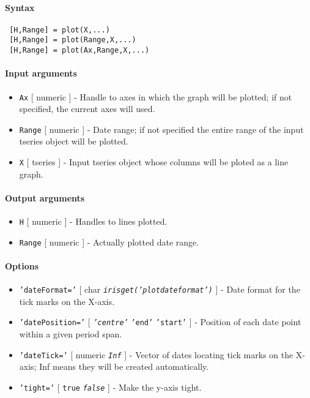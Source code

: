 


	\paragraph{Syntax}
 
 \begin{verbatim}
 [H,Range] = plot(X,...)
 [H,Range] = plot(Range,X,...)
 [H,Range] = plot(Ax,Range,X,...)
 \end{verbatim}
 
 \paragraph{Input arguments}
 
 \begin{itemize}
 \item
   \texttt{Ax} {[} numeric {]} - Handle to axes in which the graph will
   be plotted; if not specified, the current axes will used.
 \item
   \texttt{Range} {[} numeric {]} - Date range; if not specified the
   entire range of the input tseries object will be plotted.
 \item
   \texttt{X} {[} tseries {]} - Input tseries object whose columns will
   be ploted as a line graph.
 \end{itemize}
 
 \paragraph{Output arguments}
 
 \begin{itemize}
 \item
   \texttt{H} {[} numeric {]} - Handles to lines plotted.
 \item
   \texttt{Range} {[} numeric {]} - Actually plotted date range.
 \end{itemize}
 
 \paragraph{Options}
 
 \begin{itemize}
 \item
   \texttt{'dateFormat='} {[} char \textbar{}
   \emph{\texttt{irisget('plotdateformat')}} {]} - Date format for the
   tick marks on the X-axis.
 \item
   \texttt{'datePosition='} {[} \emph{\texttt{'centre'}} \textbar{}
   \texttt{'end'} \textbar{} \texttt{'start'} {]} - Position of each date
   point within a given period span.
 \item
   \texttt{'dateTick='} {[} numeric \textbar{} \emph{\texttt{Inf}} {]} -
   Vector of dates locating tick marks on the X-axis; Inf means they will
   be created automatically.
 \item
   \texttt{'tight='} {[} \texttt{true} \textbar{} \emph{\texttt{false}}
   {]} - Make the y-axis tight.
 \end{itemize}
 
